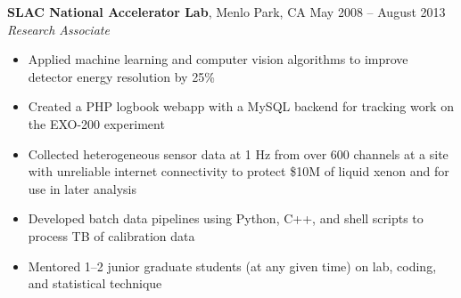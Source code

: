 \documentclass[margin,line]{resume}
\begin{document}
\begin{resume}
    \textbf{SLAC National Accelerator Lab}, Menlo Park, CA \hfill May 2008 -- August 2013\vspace{1mm}\\\vspace{1mm}%
    \textsl{Research Associate}
    \begin{itemize}
    \item Applied machine learning and computer vision algorithms to improve detector energy resolution by 25\%
    \item Created a PHP logbook webapp with a MySQL backend for tracking work on the EXO-200 experiment
    \item Collected heterogeneous sensor data at 1 Hz from over 600 channels at a site with unreliable internet connectivity to protect \$10M of liquid xenon and for use in later analysis
    \item Developed batch data pipelines using Python, C++, and shell scripts to process TB of calibration data
    \item Mentored 1--2 junior graduate students (at any given time) on lab, coding, and statistical technique
    \end{itemize}



\end{resume}
\end{document}
